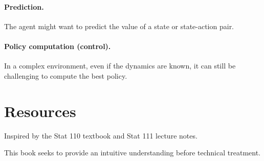 \documentclass[\main/main]{subfiles}
\begin{document}
\paragraph{Prediction.} The agent might want to predict the value of a state or state-action pair.

\paragraph{Policy computation (control).} In a complex environment, even if the dynamics are known, it can still be challenging to compute the best policy.


\section{Resources}

Inspired by the Stat 110 textbook and Stat 111 lecture notes.

This book seeks to provide an intuitive understanding before technical treatment.

\end{document}

